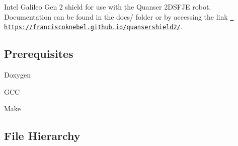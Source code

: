 Intel Galileo Gen 2 shield for use with the Quanser 2D\+S\+F\+JE robot. Documentation can be found in the {\ttfamily docs/} folder or by accessing the link \href{https://franciscoknebel.github.io/quansershield2/}{\texttt{ https\+://franciscoknebel.\+github.\+io/quansershield2/}}.

\subsection*{Prerequisites}


\begin{DoxyItemize}
\item Doxygen 
\begin{DoxyCode}{0}
\end{DoxyCode}

\item G\+CC
\item Make
\end{DoxyItemize}

\subsection*{File Hierarchy}


